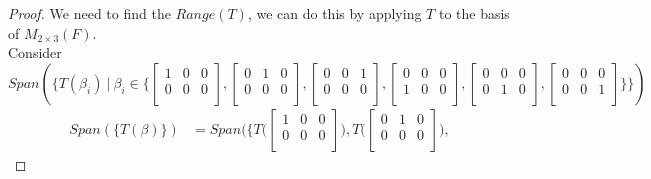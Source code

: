\documentclass[12pt]{article}
\newenvironment{exercise}[2][Exercise]{\begin{trivlist}
\item[\hskip \labelsep{\bfseries #1}\hskip \labelsep{\bfseries #2.}]}{\end{trivlist}}
\begin{document}
\begin{exercise}{2.1.4}
\begin{proof}
        \noindent We need to find the $Range(T)$, we can do this by applying $T$ to the basis of $M_{2\times3}(F)$. \\
        Consider $Span(\{T(\beta_i)\ |\ \beta_i \in 
            \{
            \begin{bmatrix}
                1 & 0 & 0 \\
                0 & 0 & 0 \\
            \end{bmatrix},
            \begin{bmatrix}
                0 & 1 & 0 \\
                0 & 0 & 0 \\
            \end{bmatrix},
            \begin{bmatrix}
                0 & 0 & 1 \\
                0 & 0 & 0 \\
            \end{bmatrix},
            \begin{bmatrix}
                0 & 0 & 0 \\
                1 & 0 & 0 \\
            \end{bmatrix},
            \begin{bmatrix}
                0 & 0 & 0 \\
                0 & 1 & 0 \\
            \end{bmatrix},
            \begin{bmatrix}
                0 & 0 & 0 \\
                0 & 0 & 1 \\
            \end{bmatrix}
        \}
        \})$
        \begin{align*} 
            Span(\{T(\beta)\})
            &= Span(\{
                    T\big(\begin{bmatrix}
                        1 & 0 & 0 \\
                        0 & 0 & 0 \\
                    \end{bmatrix}\big),
                    T\big(\begin{bmatrix}
                        0 & 1 & 0 \\
                        0 & 0 & 0 \\
                    \end{bmatrix}\big),

\end{align*}
\end{proof}
\end{exercise}
\end{document}

